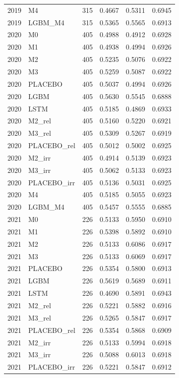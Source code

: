 \begin{tabular}{llrrrr}
2019 & M4 & 315 & 0.4667 & 0.5311 & 0.6945 \\
2019 & LGBM\_M4 & 315 & 0.5365 & 0.5565 & 0.6913 \\
2020 & M0 & 405 & 0.4988 & 0.4912 & 0.6928 \\
2020 & M1 & 405 & 0.4938 & 0.4994 & 0.6926 \\
2020 & M2 & 405 & 0.5235 & 0.5076 & 0.6922 \\
2020 & M3 & 405 & 0.5259 & 0.5087 & 0.6922 \\
2020 & PLACEBO & 405 & 0.5037 & 0.4994 & 0.6926 \\
2020 & LGBM & 405 & 0.5630 & 0.5545 & 0.6888 \\
2020 & LSTM & 405 & 0.5185 & 0.4869 & 0.6933 \\
2020 & M2\_rel & 405 & 0.5160 & 0.5220 & 0.6921 \\
2020 & M3\_rel & 405 & 0.5309 & 0.5267 & 0.6919 \\
2020 & PLACEBO\_rel & 405 & 0.5012 & 0.5002 & 0.6925 \\
2020 & M2\_irr & 405 & 0.4914 & 0.5139 & 0.6923 \\
2020 & M3\_irr & 405 & 0.5062 & 0.5133 & 0.6923 \\
2020 & PLACEBO\_irr & 405 & 0.5136 & 0.5031 & 0.6925 \\
2020 & M4 & 405 & 0.5185 & 0.5055 & 0.6923 \\
2020 & LGBM\_M4 & 405 & 0.5457 & 0.5555 & 0.6885 \\
2021 & M0 & 226 & 0.5133 & 0.5950 & 0.6910 \\
2021 & M1 & 226 & 0.5398 & 0.5892 & 0.6910 \\
2021 & M2 & 226 & 0.5133 & 0.6086 & 0.6917 \\
2021 & M3 & 226 & 0.5133 & 0.6069 & 0.6917 \\
2021 & PLACEBO & 226 & 0.5354 & 0.5800 & 0.6913 \\
2021 & LGBM & 226 & 0.5619 & 0.5689 & 0.6911 \\
2021 & LSTM & 226 & 0.4690 & 0.5891 & 0.6943 \\
2021 & M2\_rel & 226 & 0.5221 & 0.5882 & 0.6916 \\
2021 & M3\_rel & 226 & 0.5265 & 0.5847 & 0.6917 \\
2021 & PLACEBO\_rel & 226 & 0.5354 & 0.5868 & 0.6909 \\
2021 & M2\_irr & 226 & 0.5133 & 0.5994 & 0.6918 \\
2021 & M3\_irr & 226 & 0.5088 & 0.6013 & 0.6918 \\
2021 & PLACEBO\_irr & 226 & 0.5221 & 0.5847 & 0.6912 \\

\end{tabular}
